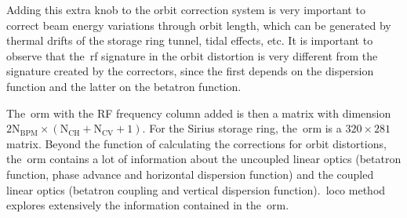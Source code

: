 Adding this extra knob to the orbit correction system is very important to correct beam energy variations through orbit length, which can be generated by thermal drifts of the storage ring tunnel, tidal effects, etc. It is important to observe that the~\gls{rf} signature in the orbit distortion is very different from the signature created by the correctors, since the first depends on the dispersion function and the latter on the betatron function.

The~\gls{orm} with the RF frequency column added is then a matrix with dimension $2 \mathrm{N}_{\mathrm{BPM}} \times \left(\mathrm{N}_{\mathrm{CH}} + \mathrm{N}_{\mathrm{CV}}+1\right)$. For the Sirius storage ring, the~\gls{orm} is a $320 \times 281$ matrix. Beyond the function of calculating the corrections for orbit distortions, the~\gls{orm} contains a lot of information about the uncoupled linear optics (betatron function, phase advance and horizontal dispersion function) and the coupled linear optics (betatron coupling and vertical dispersion function).~\gls{loco} method explores extensively the information contained in the~\gls{orm}.



